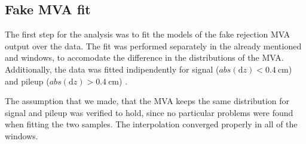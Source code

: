 \subsection{Fake MVA fit}
\label{subsec:fake_mva_fit}

The first step for the analysis was to fit the models of the fake rejection MVA output  over the data.
The fit was performed separately in the already mentioned \pt and \psrap windows, to accomodate the difference in the distributions of the MVA.
Additionally, the data was fitted indipendently for signal ($abs\left(\mathrm{d}z\right) < \SI{0.4}{\cm}$) and pileup ($abs\left(\mathrm{d}z\right) > \SI{0.4}{\cm}$) \Pgm.

The assumption that we made, that the MVA keeps the same distribution for signal and pileup \Pgm was verified to hold, since no particular problems were found when fitting the two samples.
The interpolation converged properly in all of the windows.


